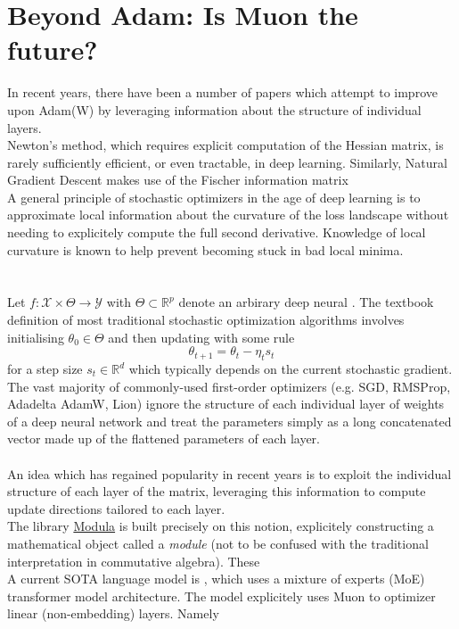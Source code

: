\documentclass[12pt]{book}
\newcommand{\R}{\mathbb{R}}
\begin{document}
\chapter{Beyond Adam: Is Muon the future?}
In recent years, there have been a number of papers which attempt to improve upon Adam(W) by leveraging information about the structure of individual layers. \\
Newton's method, which requires explicit computation of the Hessian matrix, is rarely sufficiently efficient, or even tractable, in deep learning. Similarly, Natural Gradient Descent \cite{NGdescent} makes use of the Fischer information matrix \\
A general principle of stochastic optimizers in the age of deep learning is to approximate local information about the curvature of the loss landscape without needing to explicitely compute the full second derivative. Knowledge of local curvature is known to help prevent becoming stuck in bad local minima.   \\
\\
\\
Let $f:\mathcal{X} \times \Theta \to \mathcal{Y}$ with $\Theta \subset \R^{p}$ denote an arbirary deep neural . The textbook definition of most traditional stochastic optimization algorithms involves initialising $\theta_0 \in \Theta$ and then updating with some rule 
\[
\theta_{t+1} = \theta_t - \eta_t s_t
\] 
for a step size $s_t \in \R^{d}$ which typically depends on the current stochastic gradient.  \\
The vast majority of commonly-used first-order optimizers (e.g. SGD, RMSProp, Adadelta AdamW, Lion) ignore the structure of each individual layer of weights of a deep neural network and treat the parameters simply as a long concatenated vector made up of the flattened parameters of each layer. \\
\\
An idea which has regained popularity in recent years is to exploit the individual structure of each layer of the matrix, leveraging this information to compute update directions tailored to each layer. \\ 
The library \href{https://github.com/modula-systems/modula}{Modula} is built precisely on this notion, explicitely constructing a mathematical object called a \textit{module} (not to be confused with the traditional interpretation in commutative algebra). These 
\\
A current SOTA language model is \cite{moonshot}, which uses a  mixture of experts (MoE) transformer model architecture. The model explicitely uses Muon to optimizer linear (non-embedding) layers. Namely
\\
\end{document}
